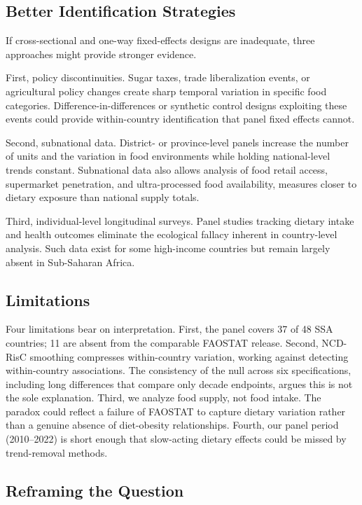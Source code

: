 \documentclass[letterpaper,11pt,leqno]{article}
\begin{document}
\subsection{Better Identification Strategies}

If cross-sectional and one-way fixed-effects designs are inadequate, three approaches might provide stronger evidence.

First, policy discontinuities. Sugar taxes, trade liberalization events, or agricultural policy changes create sharp temporal variation in specific food categories. Difference-in-differences or synthetic control designs exploiting these events could provide within-country identification that panel fixed effects cannot.

Second, subnational data. District- or province-level panels increase the number of units and the variation in food environments while holding national-level trends constant. Subnational data also allows analysis of food retail access, supermarket penetration, and ultra-processed food availability, measures closer to dietary exposure than national supply totals.

Third, individual-level longitudinal surveys. Panel studies tracking dietary intake and health outcomes eliminate the ecological fallacy inherent in country-level analysis. Such data exist for some high-income countries but remain largely absent in Sub-Saharan Africa.

\subsection{Limitations}

Four limitations bear on interpretation. First, the panel covers 37 of 48 SSA countries; 11 are absent from the comparable FAOSTAT release. Second, NCD-RisC smoothing compresses within-country variation, working against detecting within-country associations. The consistency of the null across six specifications, including long differences that compare only decade endpoints, argues this is not the sole explanation. Third, we analyze food supply, not food intake. The paradox could reflect a failure of FAOSTAT to capture dietary variation rather than a genuine absence of diet-obesity relationships. Fourth, our panel period (2010--2022) is short enough that slow-acting dietary effects could be missed by trend-removal methods.

\subsection{Reframing the Question}
\end{document}
